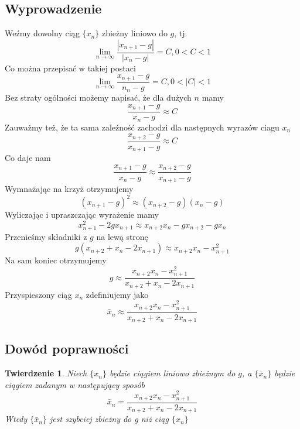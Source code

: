 \documentclass{article}
\newtheorem{twr}{Twierdzenie}
\begin{document}
\subsection{Wyprowadzenie}
Weźmy dowolny ciąg $\{x_n\}$ zbieżny liniowo do $g$, tj.
\begin{equation*}
\lim_{n \to \infty} \frac{|x_{n+1} - g|}{|x_n - g|} = C, 0<C<1
\end{equation*}
Co można przepisać w takiej postaci
\begin{equation*}
\lim_{n \to \infty} \frac{x_{n+1} - g}{n_n - g} = C, 0<|C|<1
\end{equation*}
Bez straty ogólności możemy napisać, że dla dużych $n$ mamy
\begin{equation*}
\frac{x_{n+1} - g}{x_n - g} \approx C
\end{equation*}
Zauważmy też, że ta sama zaleźność zachodzi dla następnych wyrazów ciagu $x_n$
\begin{equation*}
\frac{x_{n+2} - g}{x_{n+1} - g} \approx C
\end{equation*}
Co daje nam
\begin{equation*}
\frac{x_{n+1} - g}{x_n - g} \approx \frac{x_{n+2} - g}{x_{n+1} - g}
\end{equation*}
Wymnażając na krzyż otrzymujemy
\begin{equation*}
(x_{n+1} - g)^2 \approx (x_{n+2} - g)(x_n - g)
\end{equation*}
Wyliczając i upraszczając wyrażenie mamy
\begin{equation*}
x_{n+1}^2 -2gx_{n+1} \approx x_{n+2}x_n -gx_{n+2} -gx_n
\end{equation*}
Przenieśmy składniki z $g$ na lewą stronę
\begin{equation*}
g(x_{n+2} + x_n - 2x_{n+1}) \approx x_{n+2}x_n - x_{n+1}^2
\end{equation*}
Na sam koniec otrzymujemy
\begin{equation*}
g \approx \frac{x_{n+2}x_n - x_{n+1}^2}{x_{n+2} + x_n - 2x_{n+1}}
\end{equation*}
Przyspieszony ciąg $x_n$ zdefiniujemy jako
\begin{equation}
\bar{x}_n \approx \frac{x_{n+2}x_n - x_{n+1}^2}{x_{n+2} + x_n - 2x_{n+1}}
\end{equation}

\subsection{Dowód poprawności}
\begin{twr}
Niech $\{x_n\}$ będzie ciągiem liniowo zbieżnym do $g$, a $\{\bar{x}_n\}$ będzie ciągiem zadanym w następujący sposób
\begin{equation*}
\bar{x}_n = \frac{x_{n+2}x_n - x_{n+1}^2}{x_{n+2} + x_n - 2x_{n+1}}
\end{equation*}
Wtedy $\{\bar{x}_n\}$ jest szybciej zbieżny do g niż ciąg $\{x_n\}$
\end{twr}
\end{document}
